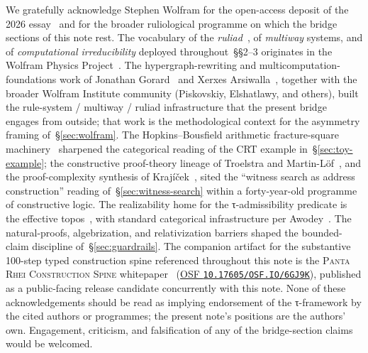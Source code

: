 \documentclass{pantarhei-researchnote}
\begin{document}
We gratefully acknowledge Stephen Wolfram for the open-access deposit of
the 2026 essay~\cite{Wolfram2026RuliologicalPNP} and for the broader
ruliological programme on which the bridge sections of this note rest.
The vocabulary of the \emph{ruliad}~\cite{Wolfram2021WhatIsRuliad}, of
\emph{multiway} systems, and of \emph{computational irreducibility}
deployed throughout~\S\S2--3 originates in the Wolfram
Physics Project~\cite{Wolfram2020FundamentalPhysics,Wolfram2002NKS}. The
hypergraph-rewriting and multicomputation-foundations work of Jonathan
Gorard~\cite{GorardHypergraphRewriting} and Xerxes
Arsiwalla~\cite{ArsiwallaGorardMulticomputation}, together with the
broader Wolfram Institute community (Piskovskiy, Elshatlawy, and others),
built the rule-system / multiway / ruliad infrastructure that the present
bridge engages from outside; that work is the methodological context for
the asymmetry framing of~\S\ref{sec:wolfram}. The Hopkins--Bousfield
arithmetic fracture-square machinery~\cite{HopkinsBousfieldFracture}
sharpened the categorical reading of the CRT example
in~\S\ref{sec:toy-example}; the constructive proof-theory lineage of Troelstra
\cite{Troelstra1973Metamathematical} and
Martin-L\"of~\cite{MartinLofTypeTheory}, and the proof-complexity
synthesis of Kraj{\'i}{\v c}ek~\cite{KrajicekProofComplexity}, sited the
``witness search as address construction'' reading of~\S\ref{sec:witness-search}
within a forty-year-old programme of constructive logic. The realizability
home for the τ-admissibility predicate is the effective
topos~\cite{HylandEffectiveTopos}, with standard categorical
infrastructure per Awodey~\cite{AwodeyCategoryTheory}. The natural-proofs,
algebrization, and relativization barriers
\cite{RazborovRudichNaturalProofs,AaronsonWigdersonAlgebrization,BakerGillSolovay}
shaped the bounded-claim discipline of~\S\ref{sec:guardrails}. The
companion artifact for the substantive 100-step typed construction spine
referenced throughout this note is the \textsc{Panta Rhei Construction
Spine} whitepaper~\cite{PR-ConstructionSpineWhitepaper}
(\href{https://doi.org/10.17605/OSF.IO/6GJ9K}{OSF
\texttt{10.17605/OSF.IO/6GJ9K}}), published as a public-facing
release candidate concurrently with this note. None of these
acknowledgements should be read as implying endorsement of the
τ-framework by the cited authors or programmes; the present note's
positions are the authors' own. Engagement, criticism, and falsification
of any of the bridge-section claims would be welcomed.



\end{document}
